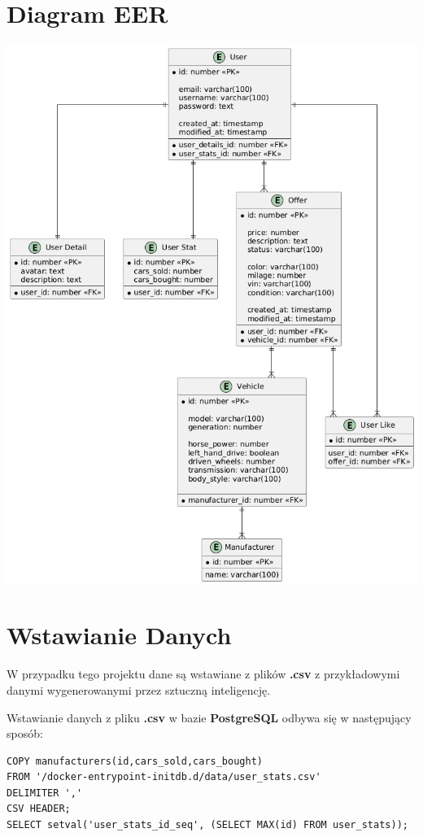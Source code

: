 \documentclass[a4paper,11pt]{article}
\begin{document}
\section*{Diagram EER}
\includegraphics[width=\textwidth]{database_sql.png}
\pagebreak

\section*{Wstawianie Danych}
W przypadku tego projektu dane są wstawiane z plików \textbf{.csv} z przykładowymi danymi wygenerowanymi przez sztuczną inteligencję.
\linebreak

Wstawianie danych z pliku \textbf{.csv} w bazie \textbf{PostgreSQL} odbywa się w następujący sposób:

\begin{verbatim}
COPY manufacturers(id,cars_sold,cars_bought)
FROM '/docker-entrypoint-initdb.d/data/user_stats.csv'
DELIMITER ','
CSV HEADER;
SELECT setval('user_stats_id_seq', (SELECT MAX(id) FROM user_stats));
\end{verbatim}
\end{document}
